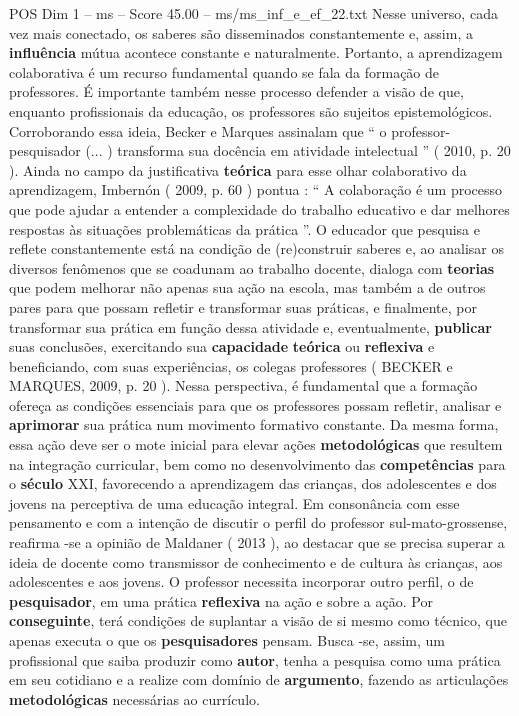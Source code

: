 \begin{textsample}{POS Dim 1 – ms – Score 45.00 – ms/ms\_inf\_e\_ef\_22.txt}
Nesse universo, cada vez mais conectado, os saberes são disseminados constantemente e, assim, a \textbf{influência} mútua acontece constante e naturalmente.
Portanto, a aprendizagem colaborativa é um recurso fundamental quando se fala da formação de professores.
É importante também nesse processo defender a visão de que, enquanto profissionais da educação, os professores são sujeitos epistemológicos.
Corroborando essa ideia, Becker e Marques assinalam que “ o professor-pesquisador (... ) transforma sua docência em atividade intelectual ” ( 2010, p. 20 ).
Ainda no campo da justificativa \textbf{teórica} para esse olhar colaborativo da aprendizagem, Imbernón ( 2009, p. 60 ) pontua : “ A colaboração é um processo que pode ajudar a entender a complexidade do trabalho educativo e dar melhores respostas às situações problemáticas da prática ”.
O educador que pesquisa e reflete constantemente está na condição de (re)construir saberes e, ao analisar os diversos fenômenos que se coadunam ao trabalho docente, dialoga com \textbf{teorias} que podem melhorar não apenas sua ação na escola, mas também a de outros pares para que possam refletir e transformar suas práticas, e finalmente, por transformar sua prática em função dessa atividade e, eventualmente, \textbf{publicar} suas conclusões, exercitando sua \textbf{capacidade} \textbf{teórica} ou \textbf{reflexiva} e beneficiando, com suas experiências, os colegas professores ( BECKER e MARQUES, 2009, p. 20 ).
Nessa perspectiva, é fundamental que a formação ofereça as condições essenciais para que os professores possam refletir, analisar e \textbf{aprimorar} sua prática num movimento formativo constante.
Da mesma forma, essa ação deve ser o mote inicial para elevar ações \textbf{metodológicas} que resultem na integração curricular, bem como no desenvolvimento das \textbf{competências} para o \textbf{século} XXI, favorecendo a aprendizagem das crianças, dos adolescentes e dos jovens na perceptiva de uma educação integral.
Em consonância com esse pensamento e com a intenção de discutir o perfil do professor sul-mato-grossense, reafirma -se a opinião de Maldaner ( 2013 ), ao destacar que se precisa superar a ideia de docente como transmissor de conhecimento e de cultura às crianças, aos adolescentes e aos jovens.
O professor necessita incorporar outro perfil, o de \textbf{pesquisador}, em uma prática \textbf{reflexiva} na ação e sobre a ação.
Por \textbf{conseguinte}, terá condições de suplantar a visão de si mesmo como técnico, que apenas executa o que os \textbf{pesquisadores} pensam.
Busca -se, assim, um profissional que saiba produzir como \textbf{autor}, tenha a pesquisa como uma prática em seu cotidiano e a realize com domínio de \textbf{argumento}, fazendo as articulações \textbf{metodológicas} necessárias ao currículo.

\end{textsample}
